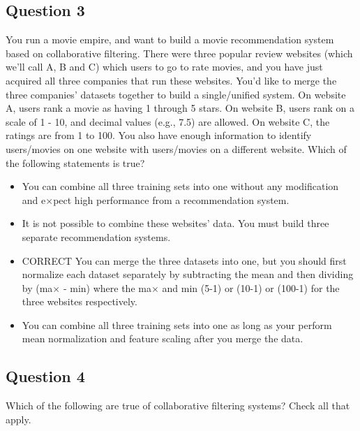 \documentclass[11pt]{article} %
\begin{document}
\subsection*{Question 3 }  

You run a movie empire, and want to build a movie recommendation system based on collaborative filtering. There were three popular review websites (which we'll call A, B and C) which users to go to rate movies, and you have just acquired all three companies that run these websites. You'd like to merge the three companies' datasets together to build a single/unified system. On website A, users rank a movie as having 1 through 5 stars. On website B, users rank on a scale of 1 - 10, and decimal values (e.g., 7.5) are allowed. On website C, the ratings are from 1 to 100. You also have enough information to identify users/movies on one website with users/movies on a different website. Which of the following statements is true?

\begin{itemize}
\item You can combine all three training sets into one without any modification and e$ \times $pect high performance from a recommendation system.

\item It is not possible to combine these websites' data. You must build three separate recommendation systems.

\item CORRECT You can merge the three datasets into one, but you should first normalize each dataset separately by subtracting the mean and then dividing by (ma$ \times $ - min) where the ma$ \times $ and min (5-1) or (10-1) or (100-1) for the three websites respectively.

\item You can combine all three training sets into one as long as your perform mean normalization and feature scaling after you merge the data.

\end{itemize}

\subsection*{Question 4 } 
Which of the following are true of collaborative filtering systems? Check all that apply.
\end{document}
